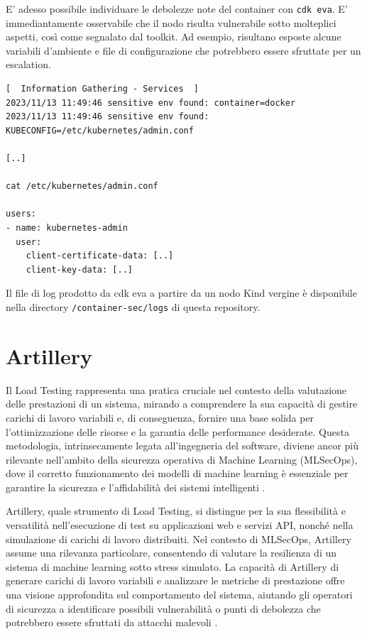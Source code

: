E' adesso possibile individuare le debolezze note del container con {\small \verb|cdk eva|}. E' immediantamente osservabile che il nodo risulta vulnerabile sotto molteplici aspetti, così come segnalato dal toolkit. Ad esempio, risultano esposte alcune variabili d'ambiente e file di configurazione che potrebbero essere sfruttate per un escalation.

\begin{code}
\label{code:apx:a:yaml}
\begin{verbatim}
[  Information Gathering - Services  ]
2023/11/13 11:49:46 sensitive env found: container=docker
2023/11/13 11:49:46 sensitive env found: KUBECONFIG=/etc/kubernetes/admin.conf

[..]

cat /etc/kubernetes/admin.conf

users:
- name: kubernetes-admin
  user:
    client-certificate-data: [..]
    client-key-data: [..]
\end{verbatim}
\end{code}

Il file di log prodotto da cdk eva a partire da un nodo Kind vergine è disponibile nella directory {\small \verb|/container-sec/logs|} di questa repository.

\section{Artillery}

Il Load Testing rappresenta una pratica cruciale nel contesto della valutazione delle prestazioni di un sistema, mirando a comprendere la sua capacità di gestire carichi di lavoro variabili e, di conseguenza, fornire una base solida per l'ottimizzazione delle risorse e la garantia delle performance desiderate. Questa metodologia, intrinsecamente legata all'ingegneria del software, diviene ancor più rilevante nell'ambito della sicurezza operativa di Machine Learning (MLSecOps), dove il corretto funzionamento dei modelli di machine learning è essenziale per garantire la sicurezza e l'affidabilità dei sistemi intelligenti \cite{load_testing_overview}.

Artillery, quale strumento di Load Testing, si distingue per la sua flessibilità e versatilità nell'esecuzione di test su applicazioni web e servizi API, nonché nella simulazione di carichi di lavoro distribuiti. Nel contesto di MLSecOps, Artillery assume una rilevanza particolare, consentendo di valutare la resilienza di un sistema di machine learning sotto stress simulato. La capacità di Artillery di generare carichi di lavoro variabili e analizzare le metriche di prestazione offre una visione approfondita sul comportamento del sistema, aiutando gli operatori di sicurezza a identificare possibili vulnerabilità o punti di debolezza che potrebbero essere sfruttati da attacchi malevoli \cite{artillery_overview}.


